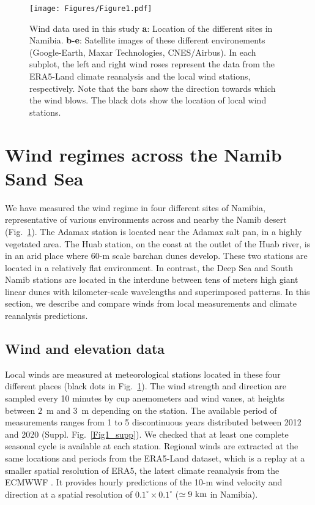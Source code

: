 \begin{figure}[t]
\centering
\texttt{[image: Figures/Figure1.pdf]}
\caption{Wind data used in this study \textbf{a}: Location of the different sites in Namibia. \textbf{b-e}: Satellite images of these different environements (Google-Earth, Maxar Technologies, CNES/Airbus). In each subplot, the left and right wind roses represent the data from the ERA5-Land climate reanalysis and the local wind stations, respectively. Note that the bars show the direction towards which the wind blows. The black dots show the location of local wind stations.}
\label{Fig1}
\end{figure}


\section{Wind regimes across the Namib Sand Sea}
We have measured the wind regime in four different sites of Namibia, representative of various environments across and nearby the Namib desert (Fig.~\ref{Fig1}). The Adamax station is located near the Adamax salt pan, in a highly vegetated area. The Huab station, on the coast at the outlet of the Huab river, is in an arid place where $60$-m scale barchan dunes develop. These two stations are located in a relatively flat  environment. In contrast, the Deep Sea and South Namib stations are located in the interdune between tens of meters high giant linear dunes with kilometer-scale wavelengths and superimposed patterns. In this section, we describe and compare winds from local measurements and climate reanalysis predictions.

\subsection{Wind and elevation data}
Local winds are measured at meteorological stations located in these four different places (black dots in Fig.~\ref{Fig1}). The wind strength and direction are sampled every 10 minutes by cup anemometers and wind vanes, at heights between $2$~m and $3$~m depending on the station. The available period of measurements ranges from 1 to 5 discontinuous years distributed between 2012 and 2020 (Suppl. Fig.~\ref{Fig1_supp}). We checked that at least one complete seasonal cycle is available at each station. Regional winds are extracted at the same locations and periods from the ERA5-Land dataset, which is a replay at a smaller spatial resolution of ERA5, the latest climate reanalysis from the ECMWWF \citep{Hersbach2020, munoz2021}. It provides hourly predictions of the 10-m wind velocity and direction at a spatial resolution of $0.1^\circ\times0.1^\circ$ ($\simeq 9~\textup{km}$ in Namibia).

